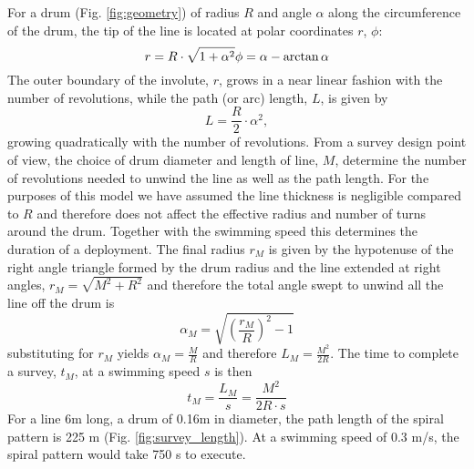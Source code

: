 
For a drum (Fig. \ref{fig:geometry}) of radius $R$ and angle $\alpha$ along the circumference of the drum, the tip of the line is located at polar coordinates $r$, $\phi$:  
\begin{equation}
r = R\cdot\sqrt{1+\alpha^2} \\
\phi = \alpha - \arctan{\alpha} 
\end{equation}
The outer boundary of the involute, $r$, grows in a near linear fashion with the number of revolutions, while the path (or arc) length, $L$, is given by
\begin{equation}
L=\frac{R}{2}\cdot\alpha^2,
\end{equation}
growing quadratically with the number of revolutions. 
From a survey design point of view, the choice of drum diameter and length of line, $M$, determine the number of revolutions needed to unwind the line as well as the path length. For the purposes of this model we have assumed the line thickness is negligible compared to $R$ and therefore does not affect the effective radius and number of turns around the drum. Together with the swimming speed this determines the duration of a deployment. The final radius $r_M$ is given by the hypotenuse of the right angle triangle formed by the drum radius and the line extended at right angles, $r_M = \sqrt{M^2 + R^2}$ and therefore the total angle swept to unwind all the line off the drum is 
\begin{equation}
\alpha_M = \sqrt{\left(\frac{r_M}{R}\right)^2 - 1}
\end{equation}
substituting for $r_M$ yields $\alpha_M = \frac{M}{R}$ and therefore $L_M = \frac{M^2}{2R}$. The time to complete a survey, $t_M$, at a swimming speed $s$ is then
\begin{equation}
t_M = \frac{L_M}{s} = \frac{M^2}{2R\cdot s}
\end{equation}
For a line 6m long, a drum of 0.16m in diameter, the path length of the spiral pattern is 225 m (Fig. \ref{fig:survey_length}). At a swimming speed of 0.3 m/s, the spiral pattern would take 750 s to execute.


    
  
  
  
  
  